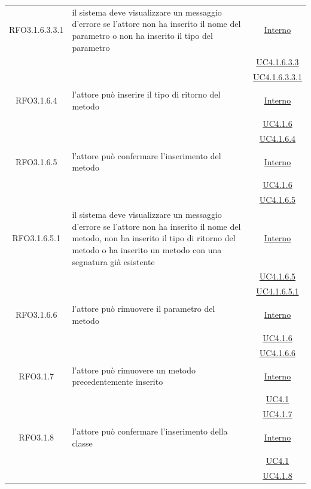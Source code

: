 \begin{itemize}
\begin{itemize}
\begin{itemize}
\begin{itemize}
\begin{longtable}{|c|>{\centering}m{7cm}|c|}
\hypertarget{RFO3.1.6.3.3.1}{RFO3.1.6.3.3.1} & il sistema deve visualizzare un messaggio d'errore se l'attore non ha inserito il nome del parametro o non ha inserito il tipo del parametro &  \hyperlink{Interno}{Interno}\\
& &\hyperref[UC4.1.6.3.3]{UC4.1.6.3.3}\\
& &\hyperref[UC4.1.6.3.3.1]{UC4.1.6.3.3.1}\\ \hline

\hypertarget{RFO3.1.6.4}{RFO3.1.6.4} & l'attore può inserire il tipo di ritorno del metodo &  \hyperlink{Interno}{Interno}\\
& &\hyperref[UC4.1.6]{UC4.1.6}\\
& &\hyperref[UC4.1.6.4]{UC4.1.6.4}\\ \hline

\hypertarget{RFO3.1.6.5}{RFO3.1.6.5} & l'attore può confermare l'inserimento del metodo & \hyperlink{Interno}{Interno}\\
& &\hyperref[UC4.1.6]{UC4.1.6}\\
& &\hyperref[UC4.1.6.5]{UC4.1.6.5}\\ \hline

\hypertarget{RFO3.1.6.5.1}{RFO3.1.6.5.1} & il sistema deve visualizzare un messaggio d'errore se l'attore non ha inserito il nome del metodo, non ha inserito il tipo di ritorno del metodo o ha inserito un metodo con una segnatura già esistente & \hyperlink{Interno}{Interno}\\
& &\hyperref[UC4.1.6.5]{UC4.1.6.5}\\
& &\hyperref[UC4.1.6.5.1]{UC4.1.6.5.1}\\ \hline

\hypertarget{RFO3.1.6.6}{RFO3.1.6.6} & l'attore può rimuovere il parametro del metodo & \hyperlink{Interno}{Interno}\\
& &\hyperref[UC4.1.6]{UC4.1.6}\\
& &\hyperref[UC4.1.6.6]{UC4.1.6.6}\\ \hline

\hypertarget{RFO3.1.7}{RFO3.1.7} & l'attore può rimuovere un metodo precedentemente inserito & \hyperlink{Interno}{Interno}\\
& &\hyperref[UC4.1]{UC4.1}\\
& &\hyperref[UC4.1.7]{UC4.1.7}\\ \hline

\hypertarget{RFO3.1.8}{RFO3.1.8} & l'attore può confermare l'inserimento della classe & \hyperlink{Interno}{Interno}\\
& &\hyperref[UC4.1]{UC4.1}\\
& &\hyperref[UC4.1.8]{UC4.1.8}\\ \hline


\end{longtable}
\end{itemize}
\end{itemize}
\end{itemize}
\end{itemize}
